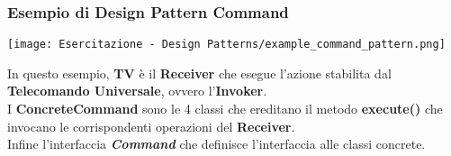 {    \begin{center}
    \end{center}
    \newpage
    \subsubsection{Esempio di Design Pattern Command}
    \begin{center}
        \texttt{[image: Esercitazione - Design Patterns/example\_command\_pattern.png]}
    \end{center}
    In questo esempio, \textbf{TV} è il \textbf{Receiver} che esegue l'azione stabilita dal \textbf{Telecomando Universale},
    ovvero l'\textbf{Invoker}. 
    \\
    I \textbf{ConcreteCommand} sono le 4 classi che ereditano il metodo \textbf{execute()} che
    invocano le corrispondenti operazioni del \textbf{Receiver}.
    \\
    Infine l'interfaccia \textbf{\textit{Command}} che definisce l'interfaccia alle classi concrete.
    \newpage

}